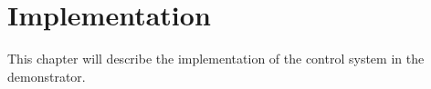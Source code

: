 \chapter{Implementation}
This chapter will describe the implementation of the control system in the demonstrator.

